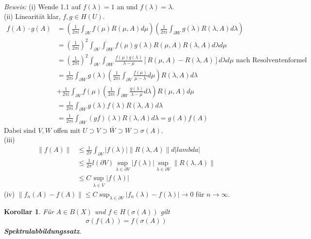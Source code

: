 \documentclass[12pt]{extreport} %
\newtheorem{Korollar}[Satz]{Korollar}
\numberwithin{equation}{section}
\newcommand{\m}{\cdot}
\newcommand{\Bew}{\emph{Beweis: }}
\begin{document}
	\Bew (i) Wende 1.1 auf $f(\lambda) = 1$ an und $f(\lambda) = \lambda$.\\
	(ii) Linearität klar, $f,g\in H(U)$. 
	\begin{align*}
		f(A) \m g(A) &= \left(\frac{1}{2\pi i} \int_{\partial V} f(\mu) R(\mu, A) d\mu\right) \left(\frac{1}{2\pi i} \int_{\partial W} g(\lambda) R(\lambda, A) d\lambda \right) \\
		&= \left(\frac{1}{2\pi i}\right)^2 \int_{\partial V}\int_{\partial W} f(\mu) g(\lambda) R(\mu, A) R(\lambda, A) d\lambda d\mu\\
		&= \left(\frac{1}{2\pi i}\right)^2 \int_{\partial V} \int_{\partial W} \frac{f(\mu)g(\lambda)}{\lambda-\mu} [R(\mu, A)-R(\lambda, A)]d\lambda d\mu \text{ nach Resolventenformel}\\
		&= \frac{1}{2\pi i} \int_{\partial W} g(\lambda) \left(\frac{1}{2\pi i} \int_{\partial V} \frac{f(\mu)}{\mu-\lambda}d\mu \right) R(\lambda, A) d\lambda \\
		&+ \frac{1}{2\pi i} \int_{\partial V} f(\mu) \left(\frac{1}{2\pi i} \int_{\partial W} \frac{g(\lambda)}{\lambda-\mu} d\lambda \right) R(\mu, A) d\mu\\
		&= \frac{1}{2\pi i} \int_{\partial W} g(\lambda) \boxed{f(\lambda)} R(\lambda, A) d\lambda \\
		&= \frac{1}{2\pi i}\int_{\partial W} (gf)(\lambda) R(\lambda, A) d\lambda= g(A) f(A)
	\end{align*}
	Dabei sind $V,W$ offen mit $U\supset V\supset \bar W\supset W \supset \sigma(A)$.\\
	(iii) 
	\begin{align*}
		\|f(A)\| &\leq \frac{1}{2\pi} \int_{\partial V} |f(\lambda)| \|R(\lambda, A)\| d|lambda|\\
		&\leq \frac{1}{2\pi} l(\partial V) \sup_{\lambda\in \partial V} |f(\lambda)| \sup_{\lambda\in\partial V} \|R(\lambda, A)\|\\
		&\leq C\sup_{\lambda\in \bar V} |f(\lambda)|	
	\end{align*}
	(iv) $\|f_n(A) - f(A)\|\leq C\sup_{\lambda\in \partial V} |f_n(\lambda)-f(\lambda)| \rightarrow 0$ für $n\rightarrow\infty$.
	
	\begin{Korollar}
		Für $A \in B(X)$ und $f\in H(\sigma(A))$ gilt
		\begin{align*}
			\sigma(f(A)) = f(\sigma(A))
		\end{align*}
		\textbf{Spektralabbildungssatz}.
	\end{Korollar}
	
\end{document}
